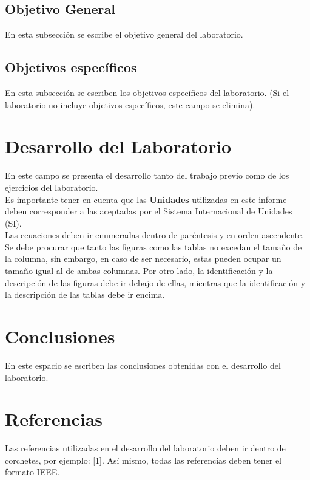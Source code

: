 \documentclass[conference]{IEEEtran}
\begin{document}
\subsection{Objetivo General}

En esta subsección se escribe el objetivo general del laboratorio.

\subsection{Objetivos específicos}

En esta subsección se escriben los objetivos específicos del laboratorio. (Si el laboratorio no incluye objetivos específicos, este campo se elimina).

\section{Desarrollo del Laboratorio}
En este campo se presenta el desarrollo tanto del trabajo previo como de los ejercicios del laboratorio.\\

Es importante tener en cuenta que las \textbf{Unidades} utilizadas en este informe deben corresponder a las aceptadas por el Sistema Internacional de Unidades (SI).\\

Las ecuaciones deben ir enumeradas dentro de paréntesis y en orden ascendente.\\

Se debe procurar que tanto las figuras como las tablas no excedan el tamaño de la columna, sin embargo, en caso de ser necesario, estas pueden ocupar un tamaño igual al de ambas columnas. Por otro lado, la identificación y la descripción de las figuras debe ir debajo de ellas, mientras que la identificación y la descripción de las tablas debe ir encima.

\section{Conclusiones}
En este espacio se escriben las conclusiones obtenidas con el desarrollo del laboratorio.

\section*{Referencias}

Las referencias utilizadas en el desarrollo del laboratorio deben ir dentro de corchetes, por ejemplo: [1]. Así mismo, todas las referencias deben tener el formato IEEE.

\end{document}
